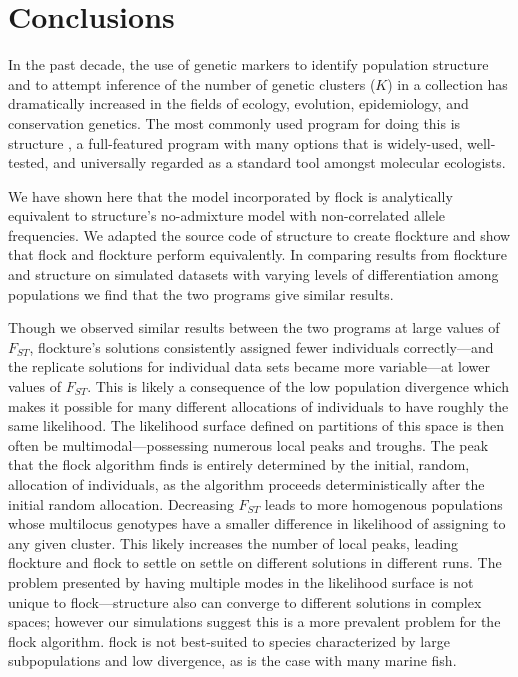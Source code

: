 \section*{Conclusions}
In the past decade, the use of genetic markers to identify population structure and to attempt inference of
the number of genetic clusters ($K$) in a collection has dramatically increased in the fields of ecology, evolution, 
epidemiology, and conservation
genetics. The most commonly used program for doing this is {\sc structure} \citep{Pritchardetal2000,Falushetal2003}, 
a full-featured program with many options that is widely-used, well-tested, and universally regarded as a standard tool amongst molecular ecologists. 


We have shown here that the model incorporated by {\sc flock} is analytically equivalent to {\sc structure}'s 
no-admixture model 
with non-correlated allele frequencies.
We adapted the source code of {\sc structure} to create {\sc flockture} and show that
{\sc flock} and {\sc flockture}  perform equivalently. 
In comparing results from {\sc flockture} and {\sc structure} 
on simulated datasets with varying levels of differentiation among populations
we find that the two programs give similar results.

Though we observed similar results
between the two programs at large values of $F_{ST}$, 
{\sc flockture}'s solutions consistently assigned fewer individuals correctly---and the
replicate solutions for individual data sets became more variable---at lower values of $F_{ST}$.
This is likely a consequence of the low population divergence which
makes it possible for many different allocations of individuals to
have roughly the same likelihood.
The likelihood surface defined on partitions of this space is then often
be multimodal---possessing numerous local peaks and troughs.
The peak that the {\sc flock} algorithm finds is entirely determined by the initial, random, allocation of 
individuals, as the algorithm proceeds deterministically after the initial random allocation.
Decreasing $F_{ST}$ leads to more homogenous 
populations whose multilocus genotypes have a smaller difference in 
likelihood of assigning to any given cluster. This likely increases the number of
local peaks, leading {\sc flockture} and {\sc flock} to settle on settle on different solutions in 
different runs. The problem presented by having multiple modes in the likelihood surface 
is not unique to {\sc flock}---{\sc structure} also can converge to 
different solutions in complex spaces; however our simulations suggest this is a more  
prevalent problem for the {\sc flock} algorithm.
{\sc flock} is not best-suited to species characterized by large
subpopulations and low divergence, as is the case with many 
marine fish.   
   

